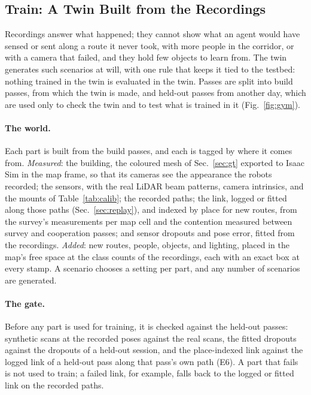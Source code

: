 \subsection{Train: A Twin Built from the Recordings}
\label{sec:twin}
Recordings answer what happened; they cannot show what an agent would
have sensed or sent along a route it never took, with more people in
the corridor, or with a camera that failed, and they hold few objects
to learn from. The twin generates such scenarios at will, with one rule
that keeps it tied to the testbed: nothing trained in the twin is
evaluated in the twin. Passes are split into build passes, from which the twin is made,
and held-out passes from another day, which are used only to check the
twin and to test what is trained in it (Fig.~\ref{fig:gym}).

\paragraph{The world.} Each part is built from the build passes, and
each is tagged by where it comes from. \emph{Measured}: the building,
the coloured mesh of Sec.~\ref{sec:gt} exported to Isaac Sim
\cite{isaacsim} in the map frame, so that its cameras see the
appearance the robots recorded; the sensors, with the
real LiDAR beam patterns, camera intrinsics, and the mounts of
Table~\ref{tab:calib}; the recorded paths; the link, logged or fitted
along those paths (Sec.~\ref{sec:replay}), and indexed by place for new
routes, from the survey's measurements per map cell and the contention
measured between survey and cooperation passes; and sensor dropouts
and pose error, fitted from the recordings. \emph{Added}: new routes,
people, objects, and lighting, placed in the map's free space at the
class counts of the recordings, each with an exact box at every stamp.
A scenario chooses a setting per part, and any number of scenarios are
generated.

\paragraph{The gate.} Before any part is used for training, it is
checked against the held-out passes: synthetic scans at the recorded
poses against the real scans, the fitted dropouts against the dropouts
of a held-out session, and the place-indexed link against the logged
link of a held-out pass along that pass's own path (E6). A part that
fails is not used to train; a failed link, for example, falls back to
the logged or fitted link on the recorded paths.

